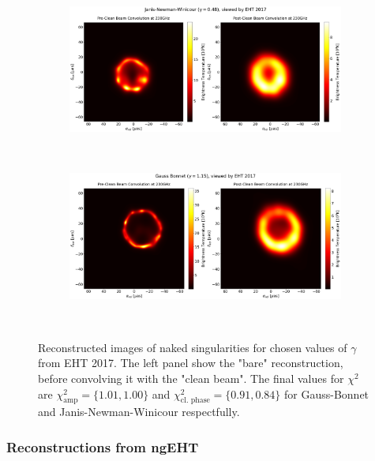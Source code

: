 \documentclass[12pt]{article}
\numberwithin{equation}{section}
\numberwithin{figure}{section}
\begin{document}
	\newpage
	\begin{figure}[h!]
		\centering
		\begin{subfigure}{12cm}
			\hspace{-1.5cm}
			\includegraphics[scale = 0.23]{Section_8_Observing_Horizonless_Objects/Ehtim_plot_2017_no_blur_JNW.png}
		\end{subfigure}\\
		\begin{subfigure}{12cm}
			\hspace{-1.5cm}
			\includegraphics[scale = 0.23]{Section_8_Observing_Horizonless_Objects/Ehtim_plot_2017_no_blur_GB.png}
		\end{subfigure}\\
		\label{Naked_Singularity_EHT_2017}
		\caption[Reconstructed images of naked singularities for chosen values of $\gamma$ from EHT 2017.]{\small Reconstructed images of naked singularities for chosen values of $\gamma$ from EHT 2017. The left panel show the "bare" reconstruction, before convolving it with the "clean beam". The final values for $\chi^2$ are $\chi^2_\text{amp} = \{1.01, 1.00\}$ and $\chi^2_\text{cl. phase} = \{0.91, 0.84\}$ for Gauss-Bonnet and Janis-Newman-Winicour respectfully.} 
	\end{figure}
	
	\subsubsection{Reconstructions from ngEHT}
	
\end{document}
